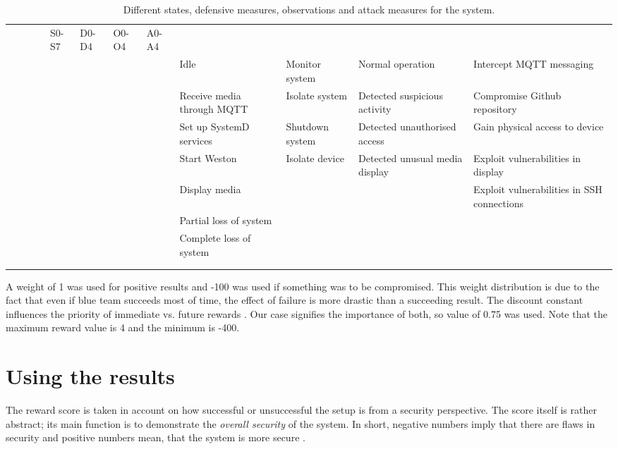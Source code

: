 \begin{landscape}
\begin{table}
\centering
\begin{tabular}{ |c|c|c|c| }
 \hline & & & & S0-S7 & D0-D4 & O0-O4 & A0-A4 \\ & & & & \hline \hline
 & & & & Idle & Monitor system & Normal operation & Intercept MQTT
 messaging \\ & & & & \hline & & & & Receive media through MQTT &
 Isolate system & Detected suspicious activity & Compromise Github
 repository \\ & & & & \hline & & & & Set up SystemD services &
 Shutdown system & Detected unauthorised access & Gain physical access
 to device \\ & & & & \hline & & & & Start Weston & Isolate device &
 Detected unusual media display & Exploit vulnerabilities in display
 \\ & & & & \hline & & & & Display media & & & Exploit vulnerabilities
 in SSH connections \\ & & & & \hline & & & & Partial loss of system &
 \ & \ & \\ & & & & \hline & & & & Complete loss of system & & & \\ &
 & & & \hline & & & & & & & \\ & & & & \hline

\end{tabular}
\caption[POMDP attack graph.]{Different states, defensive measures, observations and attack
  measures for the system.}
\label{pomdbtable}
\end{table}
\end{landscape}

A weight of 1 was used for positive results and -100 was used if something
was to be compromised. This weight distribution is due to the fact
that even if blue team succeeds most of time, the effect of failure
is more drastic than a succeeding result. The
discount constant influences the priority of immediate
vs. future rewards \cite{mcabeeMarkov}. Our case signifies the
importance of both, so value of 0.75 was used. Note that the maximum
reward value is 4 and the minimum is -400.

\section{Using the results} \label{usingtheresults}

The reward score is taken in account on how
successful or unsuccessful the setup is from a security perspective. The
score itself is rather abstract; its main function is to demonstrate
the \textit{overall security} of the system. In short, negative
numbers imply that there are flaws in security and positive numbers mean,
that the system is more secure
\cite{mcabeeMarkov}.


